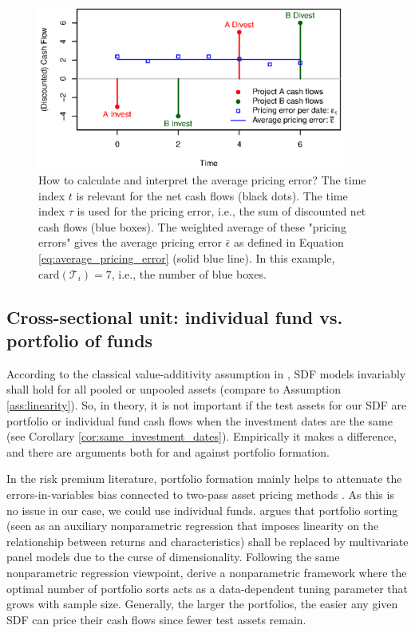 \documentclass[12pt]{article}
\begin{document}
\begin{figure}[ht]
	\centering
	\includegraphics[width=0.9\textwidth]{Figures/spatial/npvs3.eps}
	\caption{
		How to calculate and interpret the average pricing error?
		The time index $t$ is relevant for the net cash flows (black dots).
		The time index $\tau$ is used for the pricing error, i.e., the sum of discounted net cash flows (blue boxes).
		The weighted average of these "pricing errors" gives the average pricing error $\bar{\epsilon}$ as defined in Equation \ref{eq:average_pricing_error} (solid blue line).
		In this example, $\mathrm{card}(\mathcal{T}_{i})=7$, i.e., the number of blue boxes.
	}
	\label{fig:npvs}
\end{figure}

\subsection{Cross-sectional unit: individual fund vs. portfolio of funds}
\label{sec:cross_sectional_unit}

According to the classical value-additivity assumption in \cite{HR87}, SDF models invariably shall hold for all pooled or unpooled assets (compare to Assumption \ref{ass:linearity}).
So, in theory, it is not important if the test assets for our SDF are portfolio or individual fund cash flows when the investment dates are the same (see Corollary
\ref{cor:same_investment_dates}).
Empirically it makes a difference, and there are arguments both for and against portfolio formation.

In the risk premium literature, portfolio formation mainly helps to attenuate the errors-in-variables bias connected to two-pass asset pricing methods \citep{JNPR19,PRS19}.
As this is no issue in our case, we could use individual funds.
\cite{C11} argues that portfolio sorting (seen as an auxiliary nonparametric regression that imposes linearity on the relationship between returns and characteristics) shall be replaced by multivariate panel models due to the curse of dimensionality.
Following the same nonparametric regression viewpoint, \cite{CCF19} derive a nonparametric framework where the optimal number of portfolio sorts acts as a data-dependent tuning parameter that grows with sample size.
Generally, the larger the portfolios, the easier any given SDF can price their cash flows since fewer test assets remain.
\end{document}
